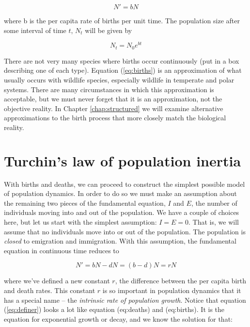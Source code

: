 \documentclass[]{book}
\begin{document}
\begin{equation*}
N' = bN 
\end{equation*}

where b is the per capita rate of births per unit time. The population
size after some interval of time \(t\), \(N_t\) will be given by

\begin{equation}
N_t = N_0 e^{bt}
\label{eq:births}
\end{equation}

There are not very many species where births occur continuously (put in
a box describing one of each type). Equation (\eqref{eq:births}) is an
approximation of what usually occurs with wildlife species, especially
wildlife in temperate and polar systems. There are many circumstances in
which this approximation is acceptable, but we must never forget that it
is an approximation, not the objective reality. In Chapter
\ref{chap:structured} we will examine alternative approximations to the
birth process that more closely match the biological reality.

\section{Turchin's law of population
inertia}\label{turchins-law-of-population-inertia}

With births and deaths, we can proceed to construct the simplest
possible model of population dynamics. In order to do so we must make an
assumption about the remaining two pieces of the fundamental equation,
\(I\) and \(E\), the number of individuals moving into and out of the
population. We have a couple of choices here, but let us start with the
simplest assumption: \(I = E = 0\). That is, we will assume that no
individuals move into or out of the population. The population is
\emph{closed} to emigration and immigration. With this assumption, the
fundamental equation in continuous time reduces to

\begin{equation}
N' = bN - dN =(b-d)N = rN
\label{eq:definer}
\end{equation}

where we've defined a new constant \(r\), the difference between the per
capita birth and death rates. This constant \(r\) is so important in
population dynamics that it has a special name -- the \emph{intrinsic
rate of population growth}. Notice that equation (\eqref{eq:definer})
looks a lot like equation (eq:deaths) and (eq:births). It is the
equation for exponential growth or decay, and we know the solution for
that:
\end{document}
